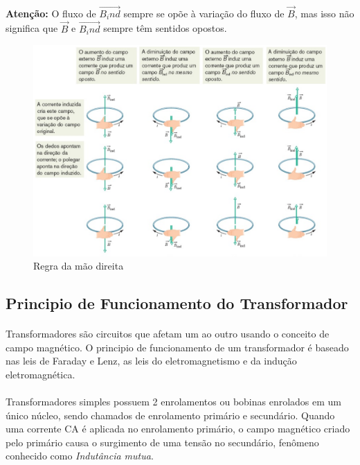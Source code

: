 \documentclass[a4paper, 12pt]{article}
\begin{document}
\paragraph{}\textbf{Atenção:} O fluxo de $\overrightarrow{B_ind}$ sempre se opõe à variação do fluxo de $\overrightarrow{B}$, mas isso não significa que $\overrightarrow{B}$ e $\overrightarrow{B_ind}$ sempre têm sentidos opostos. 
\\
\begin{figure}[h]
    \begin{center}
        \includegraphics[width=170mm]{novo.PNG}
    \end{center}
    \caption{Regra da mão direita}
    \label{Fig. Exemplo}
\end{figure}

    \newpage
    \subsection{Principio de Funcionamento do Transformador}
    \paragraph{}Transformadores são circuitos que afetam um ao outro usando o conceito de campo magnético. O principio de funcionamento de um transformador é baseado nas leis de Faraday e Lenz, as leis do eletromagnetismo e da indução eletromagnética.
\paragraph{}Transformadores simples possuem 2 enrolamentos ou bobinas enrolados em um único núcleo, sendo chamados de enrolamento primário e secundário. Quando uma corrente CA é aplicada no enrolamento primário, o campo magnético criado pelo primário causa o surgimento de uma tensão no secundário, fenômeno conhecido como \textit{Indutância mutua}.
\end{document}
